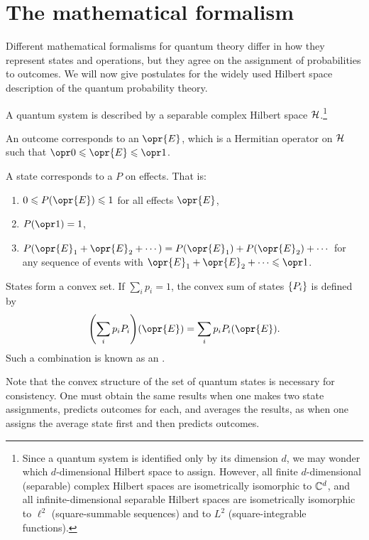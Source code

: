 \documentclass[../thesis.tex]{subfiles}
\begin{document}
\section{The mathematical formalism}\label{sec:math-form}

Different mathematical formalisms for quantum theory differ in how they
represent states and operations, but they agree on the assignment of
probabilities to outcomes. We will now give postulates for the widely used
Hilbert space description of the quantum probability theory.
\begin{post}\label{post:hilb}
  A quantum system is described by a separable complex Hilbert space
  $\mathcal{H}$.\footnote{%
    Since a quantum system is identified only by its dimension $d$, we may
    wonder which $d$-dimensional Hilbert space to assign. However, all finite
    $d$-dimensional (separable) complex Hilbert spaces are isometrically
    isomorphic to $\mathbb{C}^d$, and all infinite-dimensional separable Hilbert spaces
    are isometrically isomorphic to $\ell^2$ (square-summable sequences) and
    to $L^2$ (square-integrable functions).
  }
\end{post}

\begin{post}\label{post:effects}
  An outcome corresponds to an  $\opr{E}$, which is a Hermitian
  operator on $\mathcal{H}$ such that $\zopr \le \opr{E} \le \idopr$.\footnotemark%
\end{post}

\begin{post}\label{post:probability_measure}
  A state corresponds to a  $P$ on effects. That is:
  \begin{enumerate}
    \item $0 \le P(\opr{E}) \le 1$ for all effects $\opr{E}$,
    \item $P(\idopr) = 1$,
    \item $P(\opr{E}_1 + \opr{E}_2 + \cdots) = P(\opr{E}_1) + P(\opr{E}_2)
      + \cdots$ for any sequence of events with $\opr{E}_1 + \opr{E}_2 + \cdots
      \le \idopr$.
  \end{enumerate}
\end{post}

\begin{post}\label{post:convex}
  States form a convex set. If $\sum_i p_i = 1$, the convex sum of states
  $\qty{P_i}$ is defined by
  \begin{equation}
    \qty(\sum_i p_i P_i)(\opr{E})
    = \sum_i p_i P_i(\opr{E}).
    \label{eq:convex}
  \end{equation}
  Such a combination is known as an .
\end{post}
Note that the convex structure of the set of quantum states is necessary for
consistency. One must obtain the same results when one makes two state
assignments, predicts outcomes for each, and averages the results, as when one
assigns the average state first and then predicts outcomes.
\end{document}
